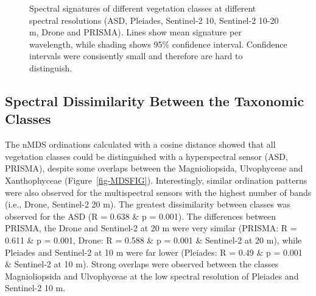 \documentclass[
  letterpaper,
  11pt,
  english,
  singlespacing,
  headsepline]{MastersDoctoralThesis}
\begin{document}
\begin{spacing}{1.5}
\begin{figure}
{}

\caption{\label{fig-SpectraFIG}Spectral signatures of different
vegetation classes at different spectral resolutions (ASD, Pleiades,
Sentinel-2 10, Sentinel-2 10-20 m, Drone and PRISMA). Lines show mean
signature per wavelength, while shading shows 95\% confidence interval.
Confidence intervals were consisently small and therefore are hard to
distinguish.}

\end{figure}%

\subsection{Spectral Dissimilarity Between the Taxonomic
Classes}\label{spectral-dissimilarity-between-the-taxonomic-classes}

The nMDS ordinations calculated with a cosine distance showed that all
vegetation classes could be distinguished with a hyperspectral sensor
(ASD, PRISMA), despite some overlaps between the Magnioliopsida,
Ulvophyceae and Xanthophyceae (Figure~\ref{fig-MDSFIG}). Interestingly,
similar ordination patterns were also observed for the multispectral
sensors with the highest number of bands (i.e., Drone, Sentinel-2 20 m).
The greatest dissimilarity between classes was observed for the ASD (R =
0.638 \& p = 0.001). The differences between PRISMA, the Drone and
Sentinel-2 at 20 m were very similar (PRISMA: R = 0.611 \& p = 0.001,
Drone: R = 0.588 \& p = 0.001 \& Sentinel-2 at 20 m), while Pleiades and
Sentinel-2 at 10 m were far lower (Pleiades: R = 0.49 \& p = 0.001 \&
Sentinel-2 at 10 m). Strong overlaps were observed between the classes
Magnioliopsida and Ulvophyceae at the low spectral resolution of
Pleiades and Sentinel-2 10 m.

\begin{figure}

\end{figure}
\end{spacing}
\end{document}
